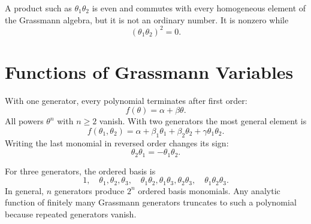 A product such as \(\theta_1\theta_2\) is even and commutes with every homogeneous element of the Grassmann algebra, but it is not an ordinary number. It is nonzero while
\begin{equation}
(\theta_1\theta_2)^2=0.
\end{equation}

\begin{classroomqa}
\end{classroomqa}

\section{Functions of Grassmann Variables}

With one generator, every polynomial terminates after first order:
\begin{equation}
f(\theta)=\alpha+\beta\theta.
\end{equation}
All powers \(\theta^n\) with \(n\geq2\) vanish. With two generators the most general element is
\begin{equation}
f(\theta_1,\theta_2)
=\alpha+\beta_1\theta_1+\beta_2\theta_2
+\gamma\theta_1\theta_2.
\end{equation}
Writing the last monomial in reversed order changes its sign:
\begin{equation}
\theta_2\theta_1=-\theta_1\theta_2.
\end{equation}

\begin{classroomqa}
\end{classroomqa}

For three generators, the ordered basis is
\begin{equation}
1,\quad
\theta_1,\theta_2,\theta_3,\quad
\theta_1\theta_2,\theta_1\theta_3,\theta_2\theta_3,\quad
\theta_1\theta_2\theta_3.
\end{equation}
In general, \(n\) generators produce \(2^n\) ordered basis monomials. Any analytic function of finitely many Grassmann generators truncates to such a polynomial because repeated generators vanish. 

